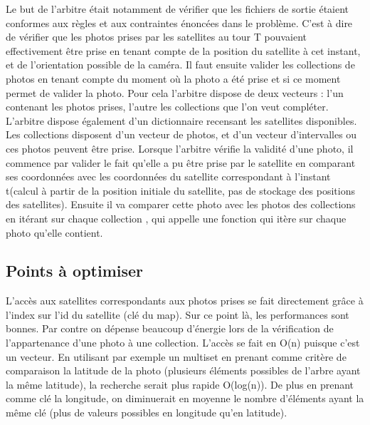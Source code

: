 \documentclass[11pt]{article}
\begin{document}
	Le but de l'arbitre était notamment de vérifier que les fichiers de sortie étaient conformes aux règles et aux contraintes énoncées dans le problème. C'est à dire de vérifier que les photos prises par les satellites au tour T pouvaient effectivement être prise en tenant compte de la position du satellite à cet instant, et de l'orientation possible de la caméra. Il faut ensuite valider les collections de photos en tenant compte du moment où la photo a été prise et si ce moment permet de valider la photo. Pour cela l'arbitre dispose de deux vecteurs : l'un contenant les photos prises, l'autre les collections que l'on veut compléter. L'arbitre dispose également d'un dictionnaire recensant les satellites disponibles. 
	Les collections disposent d'un vecteur de photos, et d'un vecteur d'intervalles ou ces photos peuvent être prise. 
	Lorsque l'arbitre vérifie la validité d'une photo, il commence par valider le fait qu'elle a pu être prise par le satellite en comparant ses coordonnées avec les coordonnées du satellite correspondant à l'instant t(calcul à partir de la position initiale du satellite, pas de stockage des positions des satellites). Ensuite il va comparer cette photo avec les photos des collections en itérant sur chaque collection , qui appelle une fonction qui itère sur chaque photo qu'elle contient. 
	\subsection{Points à optimiser}
	\label{subsection:points_a_optimiser}

	L'accès aux satellites correspondants aux photos prises se fait directement grâce à l'index sur l'id du satellite (clé du map). Sur ce point là, les performances sont bonnes.
	Par contre on dépense beaucoup d'énergie lors de la vérification de l'appartenance d'une photo à une collection. L'accès se fait en O(n) puisque c'est un vecteur. En utilisant par exemple un multiset en prenant comme critère de comparaison la latitude de la photo (plusieurs éléments possibles de l'arbre ayant la même latitude), la recherche serait plus rapide O(log(n)). De plus en prenant comme clé la longitude, on diminuerait en moyenne le nombre d'éléments ayant la même clé (plus de valeurs possibles en longitude qu'en latitude). 
	

\end{document}
